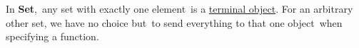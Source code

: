 In \textbf{Set}, \,any set with exactly one element\, is a \hyperref[D3.79]{terminal object}. For an arbitrary other set, we have no choice but \,to send everything to that one object\, when specifying a function.
